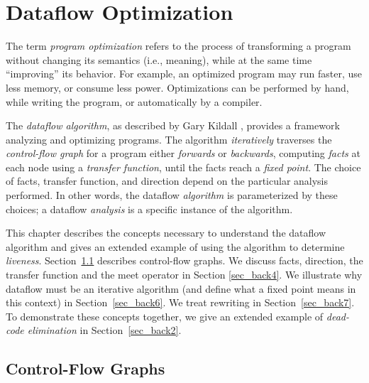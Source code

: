\documentclass[12pt]{report}
\begin{document}

\renewcommand{\textfraction}{0.1}
\renewcommand{\topfraction}{0.9}

\chapter{Dataflow Optimization}
\label{ref_chapter_background}


The term \emph{program optimization} refers to the process of
transforming a program without changing its semantics (i.e., meaning),
while at the same time ``improving'' its behavior.  For example, an
optimized program may run faster, use less memory, or consume less
power.  Optimizations can be performed by hand, while writing the
program, or automatically by a compiler.

The \emph{dataflow algorithm}, as described by Gary Kildall
\citep{Kildall1973}, provides a framework analyzing and optimizing
programs.  The algorithm \emph{iteratively} traverses the
\emph{control-flow graph} for a program either \emph{forwards} or
\emph{backwards}, computing \emph{facts} at each node using a
\emph{transfer function}, until the facts reach a \emph{fixed
  point}. The choice of facts, transfer function, and direction depend
on the particular analysis performed. In other words, the dataflow
\emph{algorithm} is parameterized by these choices; a dataflow
\emph{analysis} is a specific instance of the algorithm.

This chapter describes the concepts necessary to understand the
dataflow algorithm and gives an extended example of using the
algorithm to determine \emph{liveness}. Section~\ref{sec_back1}
describes control-flow graphs. We discuss facts, direction, the
transfer function and the meet operator in Section \ref{sec_back4}. We
illustrate why dataflow must be an iterative algorithm (and define
what a fixed point means in this context) in
Section~\ref{sec_back6}. We treat rewriting in
Section~\ref{sec_back7}. To demonstrate these concepts together, we
give an extended example of \emph{dead-code elimination} in
Section~\ref{sec_back2}.

\section{Control-Flow Graphs}
\label{sec_back1}

\end{document}
